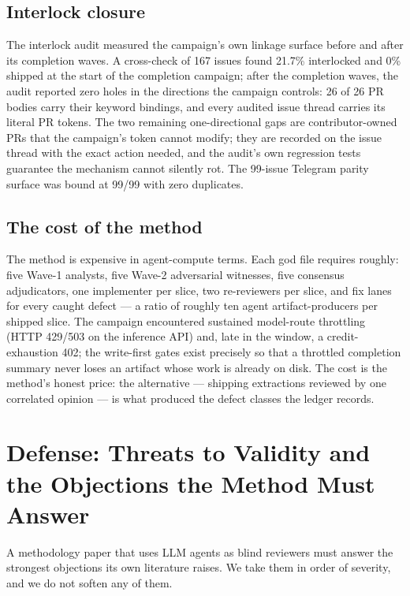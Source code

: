 \documentclass[11pt]{article}
\theoremstyle{definition}
\theoremstyle{plain}
\theoremstyle{remark}
\begin{document}
\subsection{Interlock closure}

The interlock audit measured the campaign's own linkage surface before and
after its completion waves. A cross-check of 167 issues found 21.7\%
interlocked and 0\% shipped at the start of the completion campaign; after
the completion waves, the audit reported zero holes in the directions the
campaign controls: 26 of 26 PR bodies carry their keyword bindings, and every
audited issue thread carries its literal PR tokens. The two remaining
one-directional gaps are contributor-owned PRs that the campaign's token
cannot modify; they are recorded on the issue thread with the exact action
needed, and the audit's own regression tests guarantee the mechanism cannot
silently rot. The 99-issue Telegram parity surface was bound at 99/99 with
zero duplicates.

\subsection{The cost of the method}

The method is expensive in agent-compute terms. Each god file requires
roughly: five Wave-1 analysts, five Wave-2 adversarial witnesses, five
consensus adjudicators, one implementer per slice, two re-reviewers per
slice, and fix lanes for every caught defect --- a ratio of roughly ten agent
artifact-producers per shipped slice. The campaign encountered sustained
model-route throttling (HTTP 429/503 on the inference API) and, late in the
window, a credit-exhaustion 402; the write-first gates exist precisely so
that a throttled completion summary never loses an artifact whose work is
already on disk. The cost is the method's honest price: the alternative ---
shipping extractions reviewed by one correlated opinion --- is what produced
the defect classes the ledger records.

\section{Defense: Threats to Validity and the Objections the Method Must Answer}
\label{sec:kag-defense}

A methodology paper that uses LLM agents as blind reviewers must answer the
strongest objections its own literature raises. We take them in order of
severity, and we do not soften any of them.
\end{document}
